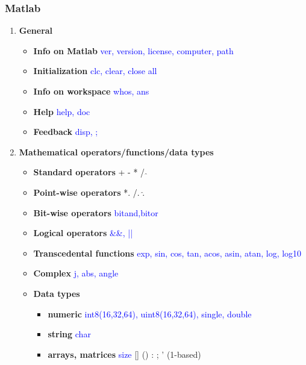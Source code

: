 \documentclass[hyperref={pdfpagelabels=true}]{beamer}
\newcounter{angle}
\begin{document}
\begin{frame}
\frametitle{Matlab}
\begin{enumerate}
\item {\bf General}
  \begin{itemize}
  \item {\bf Info on Matlab} \textcolor{blue}{ver, version, license, computer, path}
  \item {\bf Initialization}  \textcolor{blue}{clc, clear, close all}
  \item {\bf Info on workspace} \textcolor{blue}{whos, ans}
  \item {\bf Help} \textcolor{blue}{help, doc}
  \item {\bf Feedback} \textcolor{blue}{disp, ;}
  \end{itemize}
\item {\bf Mathematical operators/functions/data types}
  \begin{itemize}
  \item {\bf Standard operators} \textcolor{black}{+  -  *  /  $\hat{}$}
  \item {\bf Point-wise operators}  \textcolor{black}{*.   /.   $\hat{.}$}
  \item {\bf Bit-wise operators} \textcolor{blue}{bitand,bitor}
  \item {\bf Logical operators} \textcolor{blue}{\&\&, ||}
  \item {\bf Transcedental functions} \textcolor{blue}{exp, sin, cos, tan, acos, asin, atan, log, log10}
  \item {\bf Complex} \textcolor{blue}{j, abs, angle}
  \item {\bf Data types}
    \begin{itemize}
    \item {\bf numeric} \textcolor{blue}{int8(16,32,64), uint8(16,32,64), single, double}
    \item {\bf string} \textcolor{blue}{char}
    \item {\bf arrays, matrices} \textcolor{blue}{size} [] () : ; ' (1-based)
    \end{itemize}
  \end{itemize}
\end{enumerate}
\end{frame}
\end{document}

